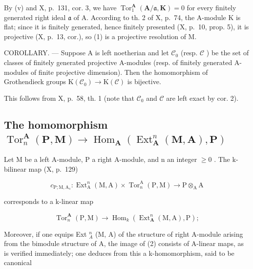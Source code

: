 By (v) and X, p.~131, cor. 3, we have \(\operatorname{Tor}_{1}^{\mathbf{A}}(\mathbf{A}/\mathfrak{a},\mathbf{K}) = 0\) for every finitely generated right ideal \(\mathfrak{a}\) of A. According to th. 2 of X, p.~74, the A-module K is flat; since it is finitely generated, hence finitely presented (X, p.~10, prop. 5), it is projective (X, p.~13, cor.), so (1) is a projective resolution of M.

COROLLARY. --- Suppose A is left noetherian and let \(\mathcal{C}_{0}\) (resp. \(\mathcal{C}\) ) be the set of classes of finitely generated projective A-modules (resp. of finitely generated A-modules of finite projective dimension). Then the homomorphism of Grothendieck groups \(\mathrm{K}(\mathcal{C}_{0}) \to \mathrm{K}(\mathcal{C})\) is bijective.

This follows from X, p.~58, th. 1 (note that \(\mathcal{C}_0\) and \(\mathcal{C}\) are left exact by cor. 2).

\subsection{\texorpdfstring{The homomorphism \(\operatorname{Tor}_n^{\mathbf{A}}(\mathbf{P},\mathbf{M})\to \operatorname{Hom}_{\mathbf{A}}(\operatorname{Ext}_{\mathbf{A}}^{n}(\mathbf{M},\mathbf{A}),\mathbf{P})\)}{The homomorphism \textbackslash operatorname\{Tor\}\_n\^{}\{\textbackslash mathbf\{A\}\}(\textbackslash mathbf\{P\},\textbackslash mathbf\{M\})\textbackslash to \textbackslash operatorname\{Hom\}\_\{\textbackslash mathbf\{A\}\}(\textbackslash operatorname\{Ext\}\_\{\textbackslash mathbf\{A\}\}\^{}\{n\}(\textbackslash mathbf\{M\},\textbackslash mathbf\{A\}),\textbackslash mathbf\{P\})}}

Let M be a left A-module, P a right A-module, and n an integer \(\geqslant 0\) . The k-bilinear map (X, p.~129)

\[
c _ {\mathrm{P}; \mathrm{M}, \mathrm{A} _ {s}}: \operatorname{Ext} _ {\mathrm{A}} ^ {n} (\mathrm{M}, \mathrm{A}) \times \operatorname{Tor} _ {n} ^ {\mathrm{A}} (\mathrm{P}, \mathrm{M}) \rightarrow \mathrm{P} \otimes_ {\mathrm{A}} \mathrm{A}
\]

corresponds to a k-linear map

\[
\operatorname{Tor} _ {n} ^ {\mathbf {A}} (\mathrm{P}, \mathrm{M}) \rightarrow \operatorname{Hom} _ {k} \left(\operatorname{Ext} _ {\mathbf {A}} ^ {n} (\mathrm{M}, \mathrm{A}), \mathrm{P}\right);\tag{2}
\]

Moreover, if one equips Ext \(_{A}^{n}\) (M, A) of the structure of right A-module arising from the bimodule structure of A, the image of (2) consists of A-linear maps, as is verified immediately; one deduces from this a k-homomorphism, said to be canonical

